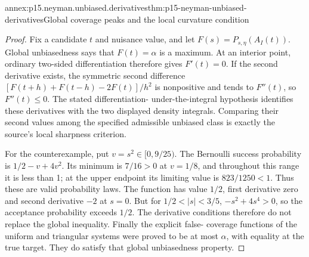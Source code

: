 \begin{annexitem}{annex:p15.neyman.unbiased.derivatives}{thm:p15-neyman-unbiased-derivatives}{Global coverage peaks and the local curvature condition}
\begin{proof}
Fix a candidate \(t\) and
nuisance value, and let
\(F(s)=P_{s,\eta}(A_I(t))\).
Global unbiasedness says
that \(F(t)=\alpha\)
is a maximum. At an
interior point, ordinary
two-sided differentiation
therefore gives \(F'(t)=0\).
If the second derivative
exists, the symmetric
second difference
\([F(t+h)+F(t-h)-2F(t)]/h^2\)
is nonpositive and tends
to \(F''(t)\), so
\(F''(t)\leq0\).
The stated differentiation-
under-the-integral hypothesis
identifies these derivatives
with the two displayed
density integrals.
Comparing their second values
among the specified admissible
unbiased class is exactly
the source's local sharpness
criterion.

For the counterexample, put
\(v=s^2\in[0,9/25)\).
The Bernoulli success probability
is \(1/2-v+4v^2\).
Its minimum is \(7/16>0\)
at \(v=1/8\), and throughout
this range it is less
than 1; at the upper
endpoint its limiting value
is \(823/1250<1\).
Thus these are valid
probability laws.
The function has value
\(1/2\), first derivative
zero and second derivative
\(-2\) at \(s=0\).
But for \(1/2<|s|<3/5\),
\(-s^2+4s^4>0\), so
the acceptance probability
exceeds \(1/2\).
The derivative conditions
therefore do not replace
the global inequality.
Finally the explicit false-
coverage functions of the
uniform and triangular
systems were proved to
be at most \(\alpha\),
with equality at the
true target. They do
satisfy that global
unbiasedness property.
\end{proof}
\end{annexitem}
